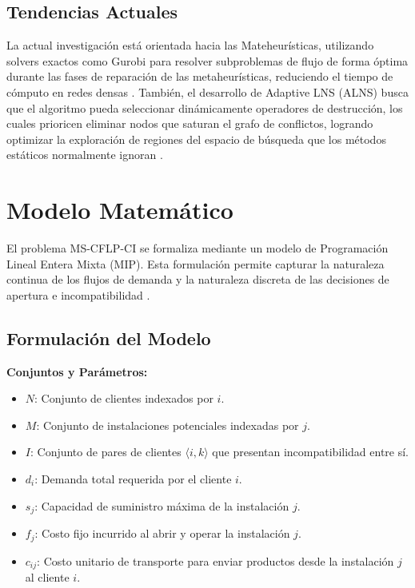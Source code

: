 \documentclass[letter, 10pt]{article}
\begin{document}
\subsection{Tendencias Actuales}
La actual investigación está orientada hacia las Mateheurísticas, utilizando solvers exactos como Gurobi para resolver subproblemas de flujo de forma óptima durante las fases de reparación de las metaheurísticas, reduciendo el tiempo de cómputo en redes densas \cite{Gjergji2025}. También, el desarrollo de Adaptive LNS (ALNS) busca que el algoritmo pueda seleccionar dinámicamente operadores de destrucción, los cuales prioricen eliminar nodos que saturan el grafo de conflictos, logrando optimizar la exploración de regiones del espacio de búsqueda que los métodos estáticos normalmente ignoran \cite{ceschia2024}.

\section{Modelo Matemático}
El problema MS-CFLP-CI se formaliza mediante un modelo de Programación Lineal Entera Mixta (MIP). Esta formulación permite capturar la naturaleza continua de los flujos de demanda y la naturaleza discreta de las decisiones de apertura e incompatibilidad \cite{ceschia2024}.

\subsection{Formulación del Modelo}

\textbf{Conjuntos y Parámetros:}
\begin{itemize}
    \item $N$: Conjunto de clientes indexados por $i$.
    \item $M$: Conjunto de instalaciones potenciales indexadas por $j$.
    \item $I$: Conjunto de pares de clientes $\langle i, k \rangle$ que presentan incompatibilidad entre sí.
    \item $d_i$: Demanda total requerida por el cliente $i$.
    \item $s_j$: Capacidad de suministro máxima de la instalación $j$.
    \item $f_j$: Costo fijo incurrido al abrir y operar la instalación $j$.
    \item $c_{ij}$: Costo unitario de transporte para enviar productos desde la instalación $j$ al cliente $i$.
\end{itemize}
\end{document}
